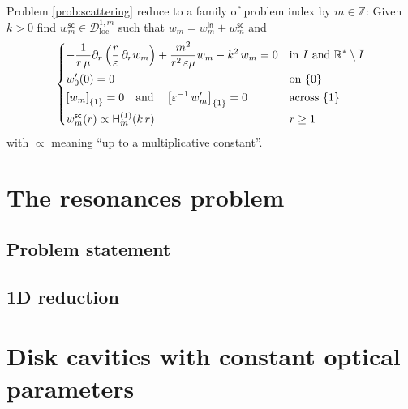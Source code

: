 \documentclass[12pt,a4paper]{article}
\newcommand{\bbR}{\mathbb{R}}
\newcommand{\bbZ}{\mathbb{Z}}
\newcommand{\calD}{\mathcal{D}}
\newcommand{\Hu}{\mathop{}\!\mathsf{H}^{(1)}}
\newcommand{\plr}[1]{\left(#1\right)}
\newcommand{\clr}[1]{\left[#1\right]}
\newcommand{\eps}{\varepsilon}
\newcommand{\loc}{\mathrm{loc}}
\newcommand{\inc}{\mathsf{in}}
\newcommand{\sca}{\mathsf{sc}}
\begin{document}
Problem \ref{prob:scattering} reduce to a family of problem index by $m \in \bbZ$: Given $k > 0$ find $w_m^\sca \in \calD^{1, m}_\loc$ such that $w_m = w_m^\inc + w_m^\sca$ and
\begin{equation}\label{prob:w_scattering}
     \begin{dcases}
        -\frac{1}{r\, \mu} \partial_r\plr{\frac{r}{\eps}\, \partial_r w_m} + \dfrac{m^2}{r^2\, \eps\mu} w_m - k^2\, w_m = 0 & \text{in } I \text{ and } \bbR^* \setminus \overline{I}      \\
        w_0'(0) = 0 & \text{on } \{0\}       \\
        \clr{w_m}_{\{1\}} = 0 \quad\text{and}\quad \clr{\eps^{-1}\, w_m'}_{\{1\}} = 0              & \text{across } \{1\}   \\
        w_m^\sca(r) \propto \Hu_m(k\, r)                                                              & r \ge 1
    \end{dcases}
\end{equation}
with $\propto$ meaning ``up to a multiplicative constant''.

\section{The resonances problem}

\subsection{Problem statement}

\subsection{1D reduction}

\section{Disk cavities with constant optical parameters}
\end{document}
